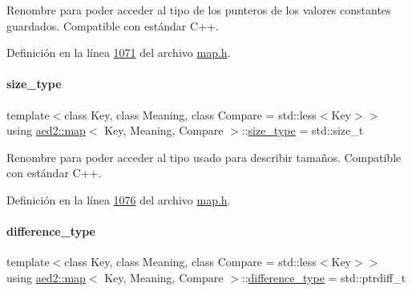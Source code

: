 Renombre para poder acceder al tipo de los punteros de los valores constantes guardados. Compatible con estándar C++. 



Definición en la línea \hyperlink{map_8h_source_l01071}{1071} del archivo \hyperlink{map_8h_source}{map.\+h}.

\mbox{\label{classaed2_1_1map_a8cf1c570f605e9c0ad6feb8ce12c9400_a8cf1c570f605e9c0ad6feb8ce12c9400}} 
\paragraph{\texorpdfstring{size\+\_\+type}{size\_type}}
{\footnotesize\ttfamily template$<$class Key, class Meaning, class Compare = std\+::less$<$\+Key$>$$>$ \\
using \hyperlink{classaed2_1_1map}{aed2\+::map}$<$ Key, Meaning, Compare $>$\+::\hyperlink{classaed2_1_1map_a8cf1c570f605e9c0ad6feb8ce12c9400_a8cf1c570f605e9c0ad6feb8ce12c9400}{size\+\_\+type} =  std\+::size\+\_\+t}



Renombre para poder acceder al tipo usado para describir tamaños. Compatible con estándar C++. 



Definición en la línea \hyperlink{map_8h_source_l01076}{1076} del archivo \hyperlink{map_8h_source}{map.\+h}.

\mbox{\label{classaed2_1_1map_a2f55b88809000fcbfce1c6cfef1ba74d_a2f55b88809000fcbfce1c6cfef1ba74d}} 
\paragraph{\texorpdfstring{difference\+\_\+type}{difference\_type}}
{\footnotesize\ttfamily template$<$class Key, class Meaning, class Compare = std\+::less$<$\+Key$>$$>$ \\
using \hyperlink{classaed2_1_1map}{aed2\+::map}$<$ Key, Meaning, Compare $>$\+::\hyperlink{classaed2_1_1map_a2f55b88809000fcbfce1c6cfef1ba74d_a2f55b88809000fcbfce1c6cfef1ba74d}{difference\+\_\+type} =  std\+::ptrdiff\+\_\+t}



